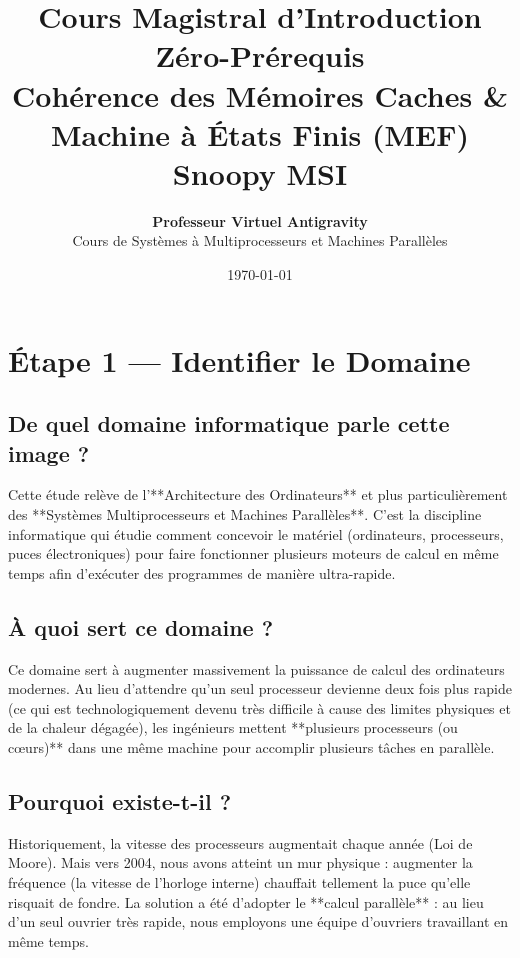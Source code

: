 \documentclass[12pt,a4paper]{article}
\title{\textbf{\Huge Cours Magistral d'Introduction Zéro-Prérequis}\\[0.5em]
\Large Cohérence des Mémoires Caches \& Machine à États Finis (MEF) Snoopy MSI}
\author{\textbf{Professeur Virtuel Antigravity} \\ Cours de Systèmes à Multiprocesseurs et Machines Parallèles}
\date{\today}
\begin{document}
\maketitle
\tableofcontents
\newpage

\section{Étape 1 — Identifier le Domaine}

\subsection{De quel domaine informatique parle cette image ?}
Cette étude relève de l'**Architecture des Ordinateurs** et plus particulièrement des **Systèmes Multiprocesseurs et Machines Parallèles**. C'est la discipline informatique qui étudie comment concevoir le matériel (ordinateurs, processeurs, puces électroniques) pour faire fonctionner plusieurs moteurs de calcul en même temps afin d'exécuter des programmes de manière ultra-rapide.

\subsection{À quoi sert ce domaine ?}
Ce domaine sert à augmenter massivement la puissance de calcul des ordinateurs modernes. Au lieu d'attendre qu'un seul processeur devienne deux fois plus rapide (ce qui est technologiquement devenu très difficile à cause des limites physiques et de la chaleur dégagée), les ingénieurs mettent **plusieurs processeurs (ou cœurs)** dans une même machine pour accomplir plusieurs tâches en parallèle.

\subsection{Pourquoi existe-t-il ?}
Historiquement, la vitesse des processeurs augmentait chaque année (Loi de Moore). Mais vers 2004, nous avons atteint un mur physique : augmenter la fréquence (la vitesse de l'horloge interne) chauffait tellement la puce qu'elle risquait de fondre. La solution a été d'adopter le **calcul parallèle** : au lieu d'un seul ouvrier très rapide, nous employons une équipe d'ouvriers travaillant en même temps.
\end{document}
